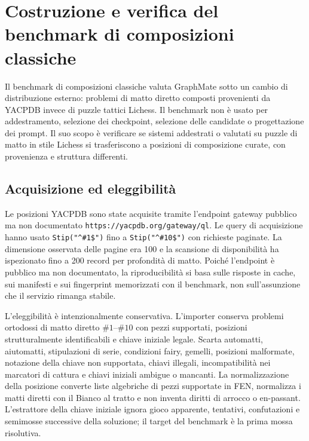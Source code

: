 \chapter{Costruzione e verifica del benchmark di composizioni classiche}
\label{app:classic-benchmark}

Il benchmark di composizioni classiche valuta GraphMate sotto un cambio di distribuzione esterno: problemi di matto diretto composti provenienti da YACPDB invece di puzzle tattici Lichess.  Il benchmark non è usato per addestramento, selezione dei checkpoint, selezione delle candidate o progettazione dei prompt.  Il suo scopo è verificare se sistemi addestrati o valutati su puzzle di matto in stile Lichess si trasferiscono a posizioni di composizione curate, con provenienza e struttura differenti.



\section{Acquisizione ed eleggibilità}
\label{app:classic-benchmark:acquisition}

Le posizioni YACPDB sono state acquisite tramite l'endpoint gateway pubblico ma non documentato \texttt{https://yacpdb.org/gateway/ql}.  Le query di acquisizione hanno usato \texttt{Stip("\^{}\#1\$")} fino a \texttt{Stip("\^{}\#10\$")} con richieste paginate.  La dimensione osservata delle pagine era 100 e la scansione di disponibilità ha ispezionato fino a 200 record per profondità di matto.  Poiché l'endpoint è pubblico ma non documentato, la riproducibilità si basa sulle risposte in cache, sui manifesti e sui fingerprint memorizzati con il benchmark, non sull'assunzione che il servizio rimanga stabile.

L'eleggibilità è intenzionalmente conservativa.  L'importer conserva problemi ortodossi di matto diretto \(\#1\)--\(\#10\) con pezzi supportati, posizioni strutturalmente identificabili e chiave iniziale legale.  Scarta automatti, aiutomatti, stipulazioni di serie, condizioni fairy, gemelli, posizioni malformate, notazione della chiave non supportata, chiavi illegali, incompatibilità nei marcatori di cattura e chiavi iniziali ambigue o mancanti.  La normalizzazione della posizione converte liste algebriche di pezzi supportate in FEN, normalizza i matti diretti con il Bianco al tratto e non inventa diritti di arrocco o en-passant.  L'estrattore della chiave iniziale ignora gioco apparente, tentativi, confutazioni e semimosse successive della soluzione; il target del benchmark è la prima mossa risolutiva.

